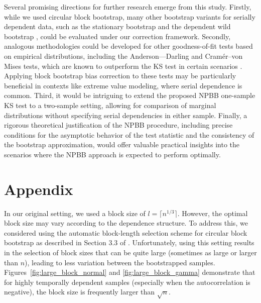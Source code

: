 \documentclass[12pt]{article}
\begin{document}
Several promising directions for further research emerge from
this study. Firstly, while we used circular block bootstrap, many
other bootstrap variants for serially dependent data, such as the
stationary bootstrap \citep{politis1994stationary} and the dependent wild
bootstrap \citep{shao2010dependent}, could be evaluated under our
correction framework. Secondly, analogous methodologies could be
developed for other goodness-of-fit tests based on empirical
distributions, including the Anderson---Darling and Cramér--von
Mises tests, which are known to outperform the KS test in certain scenarios
\citep{stephens2017tests}. Applying block bootstrap bias correction to
these tests may be particularly beneficial in contexts like extreme
value modeling, where serial dependence is common. Third, it would be
intriguing to extend the proposed NPBB
one-sample KS test to a two-sample setting, allowing for comparison of
marginal distributions without specifying serial dependencies in
either sample. Finally, a rigorous theoretical justification of the
NPBB procedure, including precise conditions for the asymptotic
behavior of the test statistic and the consistency of the bootstrap
approximation, would offer valuable practical insights into the
scenarios where the NPBB approach is expected to perform optimally.


\section{Appendix}\label{sec:appendix}
In our original setting, we used a block size of $l = \lceil n^{1/3} \rceil$.
However, the optimal block size may vary according to the dependence structure.
To address this, we considered  using the automatic block-length selection
scheme
for
circular block bootstrap as described in Section 3.3 of
\citet{politis2004automatic}. Unfortunately, using this setting results in
the selection of
block
sizes that can be quite large (sometimes as large or larger than $n$), leading
to less variation between the bootstrapped
samples. Figures~\ref{fig:large_block_normal} and \ref{fig:large_block_gamma}
demonstrate that for highly temporally
dependent samples (especially when the autocorrelation is negative),
the block size is frequently larger than $\sqrt{n}$.
\end{document}
